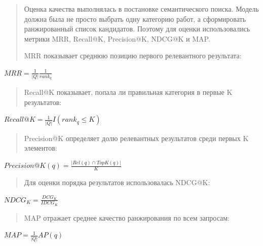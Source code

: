 \documentclass[
]{article}
\begin{document}
\begin{quote}
Оценка качества выполнялась в постановке семантического поиска. Модель
должна была не просто выбрать одну категорию работ, а сформировать
ранжированный список кандидатов. Поэтому для оценки использовались
метрики MRR, Recall@K, Precision@K, NDCG@K и MAP.

MRR показывает среднюю позицию первого релевантного результата:
\end{quote}

\(MRR = \frac{1}{|Q|}\frac{1}{rank_{q}}\)

\begin{quote}
Recall@K показывает, попала ли правильная категория в первые K
результатов:
\end{quote}

\(Recall@K = \frac{1}{|Q|}I\left( rank_{q} \leq K \right)\)

\begin{quote}
Precision@K определяет долю релевантных результатов среди первых K
элементов:
\end{quote}

\(Precision@K(q) = \frac{\left| Rel(q) \cap TopK(q) \right|}{K}\)

\begin{quote}
Для оценки порядка результатов использовалась NDCG@K:
\end{quote}

\(NDCG_{K} = \frac{DCG_{K}}{IDCG_{K}}\)

\begin{quote}
MAP отражает среднее качество ранжирования по всем запросам:
\end{quote}

\(MAP = \frac{1}{|Q|}AP(q)\)
\end{document}
